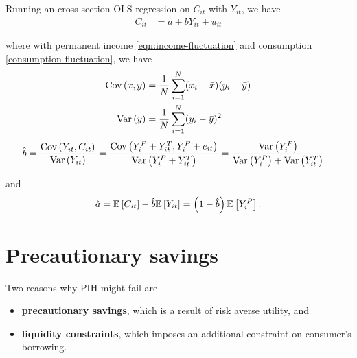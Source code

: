 \documentclass[../main.tex]{subfiles}
\begin{document}
        Running an cross-section OLS regression on $C_{it}$ with $Y_{it}$, we have
        \begin{align}
            C_{it} &= a + b Y_{it} + u_{it}
           \label{eqn:consumption-regression}
        \end{align}
        
        where with permanent income \eqref{eqn:income-fluctuation} and consumption \eqref{consumption-fluctuation}, we have
        \begin{align}
            \mathrm{Cov}\left(x, y\right) &= \frac{1}{N}\sum_{i=1}^N(x_i - \bar{x})(y_i - \bar{y}) \\
            \mathrm{Var}\left(y\right) &= \frac{1}{N}\sum_{i=1}^N(y_i - \bar{y})^2
        \end{align}
        \begin{align}
            \hat{b}
            = \frac{ \mathrm{Cov}\left(Y_{it}, C_{it}\right) }{ \mathrm{Var}\left(Y_{it}\right) }
            &= \frac{ \mathrm{Cov}\left(Y_{i}^P + Y_{it}^T, Y_{i}^P + e_{it}\right) }{ \mathrm{Var}\left(Y_{i}^P + Y_{it}^T\right) }
            = \frac{ \mathrm{Var}\left(Y_{i}^P\right) }{ \mathrm{Var}\left(Y_{i}^P\right) + \mathrm{Var}\left(Y_{it}^T\right) }
            \label{eqn:regression-bhat}
        \end{align}
        
        and 
        \begin{align}
            \hat{a}
            = \mathbb{E}\left[C_{it}\right] - \hat{b}\mathbb{E}\left[Y_{it}\right]
            = \left(1 - \hat{b}\right) \mathbb{E}\left[Y_{i}^P\right].
            \label{eqn:regression-ahat}
        \end{align}
        
    \section{Precautionary savings}
        
        Two reasons why PIH might fail are 
        \begin{itemize}
            \item 
            \textbf{precautionary savings}, which is a result of risk averse utility, and
            
            \item
            \textbf{liquidity constraints}, which imposes an additional constraint on consumer's borrowing.
        \end{itemize}
        
\end{document}
